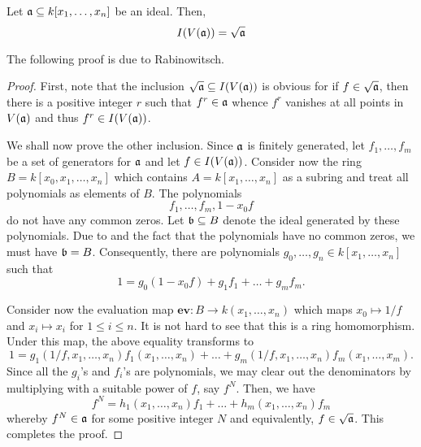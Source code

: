 \begin{theorem}
    Let $\mathfrak a\subseteq k[x_1,\dots,x_n]$ be an ideal. Then, 
    \begin{equation*}
        I(V(\mathfrak a)) = \sqrt{\mathfrak a}
    \end{equation*}
\end{theorem}
The following proof is due to Rabinowitsch.
\begin{proof}
    First, note that the inclusion $\sqrt{\mathfrak a}\subseteq I(V(\mathfrak a))$ is obvious for if $f\in\sqrt{\mathfrak a}$, then there is a positive integer $r$ such that $f^r\in\mathfrak a$ whence $f^r$ vanishes at all points in $V(\mathfrak a)$ and thus $f^r\in I(V(\mathfrak a))$.

    We shall now prove the other inclusion. Since $\mathfrak a$ is finitely generated, let $f_1,\dots,f_m$ be a set of generators for $\mathfrak a$ and let $f\in I(V(\mathfrak a))$. Consider now the ring $B = k[x_0,x_1,\dots,x_n]$ which contains $A = k[x_1,\dots,x_n]$ as a subring and treat all polynomials as elements of $B$. The polynomials
    \begin{equation*}
        f_1,\dots,f_m, 1 - x_0f
    \end{equation*}
    do not have any common zeros. Let $\mathfrak b\subseteq B$ denote the ideal generated by these polynomials. Due to  and the fact that the polynomials have no common zeros, we must have $\mathfrak b = B$. Consequently, there are polynomials $g_0,\dots,g_n\in k[x_1,\dots,x_n]$ such that 
    \begin{equation*}
        1 = g_0(1 - x_0f) + g_1f_1 + \dots + g_mf_m.
    \end{equation*}

    Consider now the evaluation map $\mathbf{ev}: B\to k(x_1,\dots,x_n)$ which maps $x_0\mapsto 1/f$ and $x_i\mapsto x_i$ for $1\le i\le n$. It is not hard to see that this is a ring homomorphism. Under this map, the above equality transforms to 
    \begin{equation*}
        1 = g_1(1/f,x_1,\dots,x_n)f_1(x_1,\dots,x_n) + \dots + g_m(1/f,x_1,\dots,x_n)f_m(x_1,\dots,x_m).
    \end{equation*}
    Since all the $g_i$'s and $f_i$'s are polynomials, we may clear out the denominators by multiplying with a suitable power of $f$, say $f^N$. Then, we have 
    \begin{equation*}
        f^N = h_1(x_1,\dots,x_n)f_1 + \dots + h_m(x_1,\dots,x_n)f_m
    \end{equation*}
    whereby $f^N\in\mathfrak a$ for some positive integer $N$ and equivalently, $f\in\sqrt{\mathfrak a}$. This completes the proof.
\end{proof}

